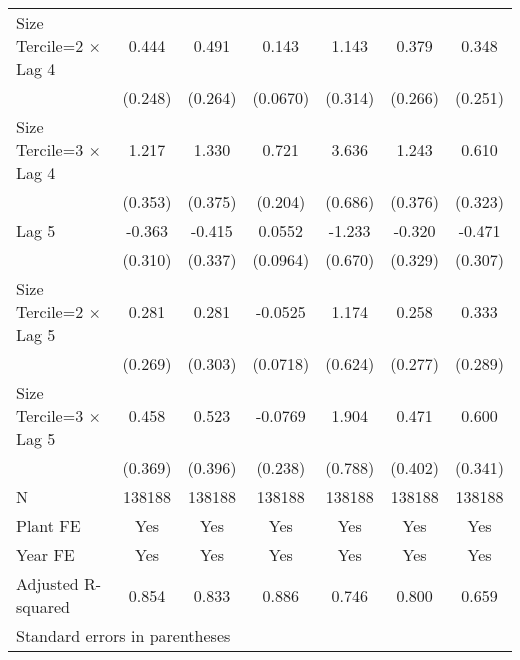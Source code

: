 \begin{table}[htbp]
\begin{tabular}{l*{6}{c}}
\addlinespace
Size Tercile=2 $\times$ Lag 4&    0.444         &    0.491         &    0.143\sym{*}  &    1.143\sym{***}&    0.379         &    0.348         \\
                &  (0.248)         &  (0.264)         & (0.0670)         &  (0.314)         &  (0.266)         &  (0.251)         \\
\addlinespace
Size Tercile=3 $\times$ Lag 4&    1.217\sym{***}&    1.330\sym{***}&    0.721\sym{***}&    3.636\sym{***}&    1.243\sym{***}&    0.610         \\
                &  (0.353)         &  (0.375)         &  (0.204)         &  (0.686)         &  (0.376)         &  (0.323)         \\
\addlinespace
Lag 5           &   -0.363         &   -0.415         &   0.0552         &   -1.233         &   -0.320         &   -0.471         \\
                &  (0.310)         &  (0.337)         & (0.0964)         &  (0.670)         &  (0.329)         &  (0.307)         \\
\addlinespace
Size Tercile=2 $\times$ Lag 5&    0.281         &    0.281         &  -0.0525         &    1.174         &    0.258         &    0.333         \\
                &  (0.269)         &  (0.303)         & (0.0718)         &  (0.624)         &  (0.277)         &  (0.289)         \\
\addlinespace
Size Tercile=3 $\times$ Lag 5&    0.458         &    0.523         &  -0.0769         &    1.904\sym{*}  &    0.471         &    0.600         \\
                &  (0.369)         &  (0.396)         &  (0.238)         &  (0.788)         &  (0.402)         &  (0.341)         \\
\midrule
N               &   138188         &   138188         &   138188         &   138188         &   138188         &   138188         \\
Plant FE        &      Yes         &      Yes         &      Yes         &      Yes         &      Yes         &      Yes         \\
Year FE         &      Yes         &      Yes         &      Yes         &      Yes         &      Yes         &      Yes         \\
Adjusted R-squared&    0.854         &    0.833         &    0.886         &    0.746         &    0.800         &    0.659         \\
\bottomrule
\multicolumn{7}{l}{\footnotesize Standard errors in parentheses}\\

\end{tabular}
\end{table}
